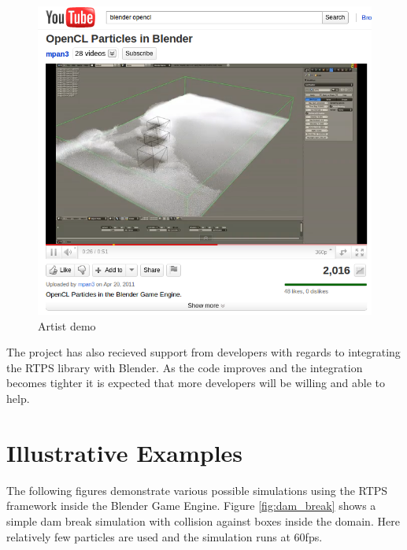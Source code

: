 \begin{figure}[!htc]
 		\centering
		\includegraphics[scale=0.75]{figures/youtube.png}
        \caption{ Artist demo }
		\label{fig:mpan}
\end{figure}

The project has also recieved support from developers with regards to
integrating the RTPS library with Blender. As the code improves and the
integration becomes tighter it is expected that more developers will be willing
and able to help.

\pagebreak

\section{Illustrative Examples}

The following figures demonstrate various possible simulations using the RTPS
framework inside the Blender Game Engine. Figure \ref{fig:dam_break} shows a
simple dam break simulation with collision against boxes inside the domain.
Here relatively few particles are used and the simulation runs at 60fps.

